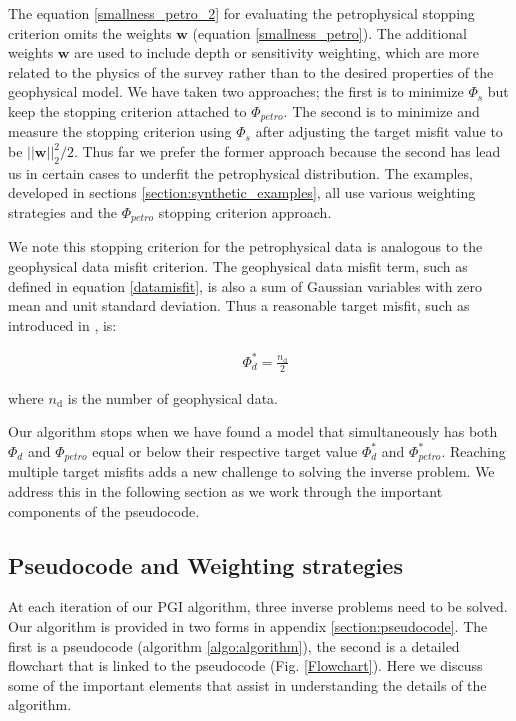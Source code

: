 \documentclass[extra]{gji} %
\begin{document}
The equation \ref{smallness_petro_2} for evaluating the petrophysical stopping criterion omits the weights $\mathbf{w}$ (equation \ref{smallness_petro}). The additional weights $\mathbf{w}$ are used to include depth or sensitivity weighting, which are more related to the physics of the survey rather than to the desired properties of the geophysical model. We have taken two approaches; the first is to minimize $\Phi_s$ but keep the stopping criterion attached to $\Phi_{petro}$. The second is to minimize and measure the stopping criterion using $\Phi_s$ after adjusting the target misfit value to be $||\mathbf{w}||^2_2/2$. Thus far we prefer the former approach because the second has lead us in certain cases to underfit the petrophysical distribution. The examples, developed in sections \ref{section:synthetic_examples}, all use various weighting strategies and the $\Phi_{petro}$ stopping criterion approach.

We note this stopping criterion for the petrophysical data is analogous to the geophysical data misfit criterion. The geophysical data misfit term, such as defined in equation \ref{datamisfit}, is also a sum of Gaussian variables with zero mean and unit standard deviation. Thus a reasonable target misfit, such as introduced in \cite{Parker}, is:

\begin{align}
& {\Phi_d^*} = \frac{n_\text{d}}{2}
\label{geophytargetmisfit}
\end{align}

where $n_\text{d}$ is the number of geophysical data.

Our algorithm stops when we have found a model that simultaneously has both $\Phi_d$ and $\Phi_{petro}$ equal or below their respective target value $\Phi_d^*$ and $\Phi_{petro}^*$. Reaching multiple target misfits adds a new challenge to solving the inverse problem. We address this in the following section as we work through the important components of the pseudocode.


\subsection{Pseudocode and Weighting strategies} \label{weighting}

At each iteration of our PGI algorithm, three inverse problems need to be solved. Our algorithm is provided in two forms in appendix \ref{section:pseudocode}. The first is a pseudocode (algorithm \ref{algo:algorithm}), the second is a detailed flowchart that is linked to the pseudocode (Fig. \ref{Flowchart}). Here we discuss some of the important elements that assist in understanding the details of the algorithm.
\end{document}

